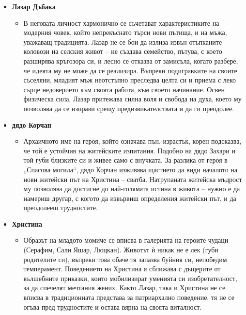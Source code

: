 \documentclass[12pt,a4paper]{article}
\begin{document}
\begin{itemize}[leftmargin=*, noitemsep, topsep=2pt, parsep=0pt]
    \item \textbf{Лазар Дъбака}
    \begin{itemize}[leftmargin=*]
        \item В неговата личност хармонично се съчетават характеристиките на модерния човек, който непрекъснато търси нови пътища, и на мъжа, уважаващ традицията. Лазар не се бои да излиза извън отъпканите коловози на селския живот – не създава семейство, пътува, с което разширява кръгозора си, и лесно се отказва от замисъла, когато разбере, че идеята му не може да се реализира. Въпреки подигравките на своите съселяни, младият мъж неотстъпно преследва целта си и приема с леко сърце недоверието към своята работа, към своето начинание. Освен физическа сила, Лазар притежава силна воля и свобода на духа, което му позволява да се изправи срещу предизвикателствата и да ги преодолее.
    \end{itemize}
    \item \textbf{дядо Корчан}
    \begin{itemize}[leftmargin=*]
        \item Архаичното име на героя, който означава пън, израстък, корен подсказва, че той е устойчив на житейските изпитания. Подобно на дядо Захари и той губи близките си и живее само с внучката. За разлика от героя в „Спасова могила“, дядо Корчан изживява щастието да види началото на нови житейски път на Христина -- сватба. Натрупаната житейска мъдрост му позволява да достигне до най-голямата истина в живота -- нужно е да намериш другар, с когото да извървиш определения житейски път, и да преодолееш трудностите.
    \end{itemize}
    \item \textbf{Христина}
    \begin{itemize}[leftmargin=*]
        \item Образът на младото момиче се вписва в галерията на героите чудаци (Серафим, Сали Яшар, Люцкан). Животът ѝ никак не е лек (губи родителите си), въпреки това обаче тя запазва буйния си, непобедим темперамент. Поведението на Христина я сближава с дъщерите от вълшебните приказки, които мобилизират уменията си изобретателност, за да спечелят мечтания жених. Както Лазар, така и Христина не се вписва в традиционната представа за патриархално поведение, тя не се огъва пред трудностите и остава вярна на своята виталност.
    \end{itemize}
\end{itemize}
\end{document}
